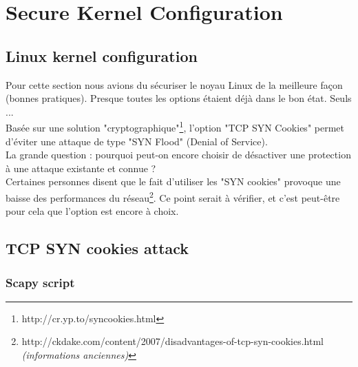 
\chapter{Secure Kernel Configuration} %

\label{Chapitre 3} %


\section{Linux kernel configuration}
Pour cette section nous avions du sécuriser le noyau Linux de la meilleure façon (bonnes pratiques). Presque toutes les options étaient déjà dans le bon état. Seuls ... %
\\




Basée sur une solution "cryptographique"\footnote{http://cr.yp.to/syncookies.html}, l'option "TCP SYN Cookies" permet d'éviter une attaque de type "SYN Flood" (Denial of Service).\\
La grande question : pourquoi peut-on encore choisir de désactiver une protection à une attaque existante et connue ? \\

Certaines personnes disent que le fait d'utiliser les "SYN cookies" provoque une baisse des performances du réseau\footnote{http://ckdake.com/content/2007/disadvantages-of-tcp-syn-cookies.html \textit{(informations anciennes)}}. Ce point serait à vérifier, et c'est peut-être pour cela que l'option est encore à choix.


\section{TCP SYN cookies attack}
\subsection{Scapy script}




